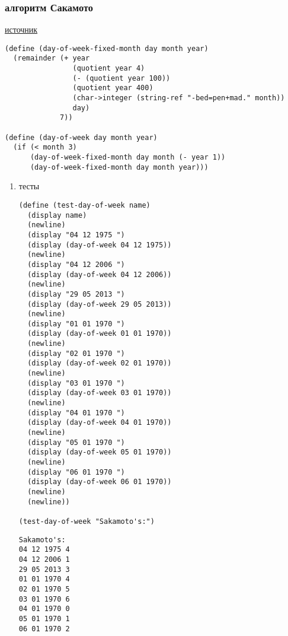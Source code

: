 \documentclass[11pt]{article}
\begin{document}
\subsubsection{алгоритм Сакамото}
\label{sec:orgfab4958}
\href{https://www.geeksforgeeks.org/tomohiko-sakamotos-algorithm-finding-day-week/}{источник}
\begin{verbatim}
(define (day-of-week-fixed-month day month year)
  (remainder (+ year
                (quotient year 4)
                (- (quotient year 100))
                (quotient year 400)
                (char->integer (string-ref "-bed=pen+mad." month))
                day)
             7))

(define (day-of-week day month year)
  (if (< month 3)
      (day-of-week-fixed-month day month (- year 1))
      (day-of-week-fixed-month day month year)))
\end{verbatim}
\begin{enumerate}
\item тесты
\label{sec:org16c824c}
\begin{verbatim}
(define (test-day-of-week name)
  (display name)
  (newline)
  (display "04 12 1975 ")
  (display (day-of-week 04 12 1975))
  (newline)
  (display "04 12 2006 ")
  (display (day-of-week 04 12 2006))
  (newline)
  (display "29 05 2013 ")
  (display (day-of-week 29 05 2013))
  (newline)
  (display "01 01 1970 ")
  (display (day-of-week 01 01 1970))
  (newline)
  (display "02 01 1970 ")
  (display (day-of-week 02 01 1970))
  (newline)
  (display "03 01 1970 ")
  (display (day-of-week 03 01 1970))
  (newline)
  (display "04 01 1970 ")
  (display (day-of-week 04 01 1970))
  (newline)
  (display "05 01 1970 ")
  (display (day-of-week 05 01 1970))
  (newline)
  (display "06 01 1970 ")
  (display (day-of-week 06 01 1970))
  (newline)
  (newline))

(test-day-of-week "Sakamoto's:")
\end{verbatim}

\begin{verbatim}
Sakamoto's:
04 12 1975 4
04 12 2006 1
29 05 2013 3
01 01 1970 4
02 01 1970 5
03 01 1970 6
04 01 1970 0
05 01 1970 1
06 01 1970 2

\end{verbatim}
\end{enumerate}
\end{document}
